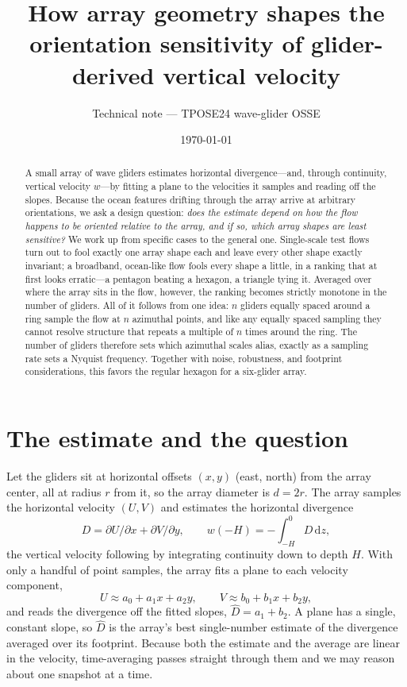 \documentclass[11pt]{article}
\title{\bfseries How array geometry shapes the orientation sensitivity of
glider-derived vertical velocity}
\author{Technical note --- TPOSE24 wave-glider OSSE}
\date{\today}
\newcommand{\Dhat}{\widehat{D}}
\newcommand{\pd}[2]{\partial #1/\partial #2}
\begin{document}
\maketitle

\begin{abstract}
\noindent
A small array of wave gliders estimates horizontal divergence---and, through continuity,
vertical velocity $w$---by fitting a plane to the velocities it samples and reading off the
slopes. Because the ocean features drifting through the array arrive at arbitrary
orientations, we ask a design question: \emph{does the estimate depend on how the flow
happens to be oriented relative to the array, and if so, which array shapes are least
sensitive?} We work up from specific cases to the general one. Single-scale test flows turn
out to fool exactly one array shape each and leave every other shape exactly invariant; a
broadband, ocean-like flow fools every shape a little, in a ranking that at first looks
erratic---a pentagon beating a hexagon, a triangle tying it. Averaged over where the array
sits in the flow, however, the ranking becomes strictly monotone in the number of gliders.
All of it follows from one idea: $n$ gliders equally spaced around a ring sample the flow at
$n$ azimuthal points, and like any equally spaced sampling they cannot resolve structure that
repeats a multiple of $n$ times around the ring. The number of gliders therefore sets which
azimuthal scales alias, exactly as a sampling rate sets a Nyquist frequency. Together with
noise, robustness, and footprint considerations, this favors the regular hexagon for a
six-glider array.
\end{abstract}

\section{The estimate and the question}
\label{sec:setup}

Let the gliders sit at horizontal offsets $(x,y)$ (east, north) from the array center, all at
radius $r$ from it, so the array diameter is $d=2r$. The array samples the horizontal velocity
$(U,V)$ and estimates the horizontal divergence
\begin{equation}
  D=\pd{U}{x}+\pd{V}{y},
  \qquad
  w(-H)=-\int_{-H}^{0} D\,\mathrm dz ,
  \label{eq:div}
\end{equation}
the vertical velocity following by integrating continuity down to depth $H$. With only a
handful of point samples, the array fits a plane to each velocity component,
\begin{equation}
  U\approx a_0+a_1x+a_2y,\qquad V\approx b_0+b_1x+b_2y,
  \label{eq:planefit}
\end{equation}
and reads the divergence off the fitted slopes, $\Dhat=a_1+b_2$. A plane has a single,
constant slope, so $\Dhat$ is the array's best single-number estimate of the divergence
averaged over its footprint. Because both the estimate and the average are linear in the
velocity, time-averaging passes straight through them and we may reason about one snapshot at
a time.
\end{document}

